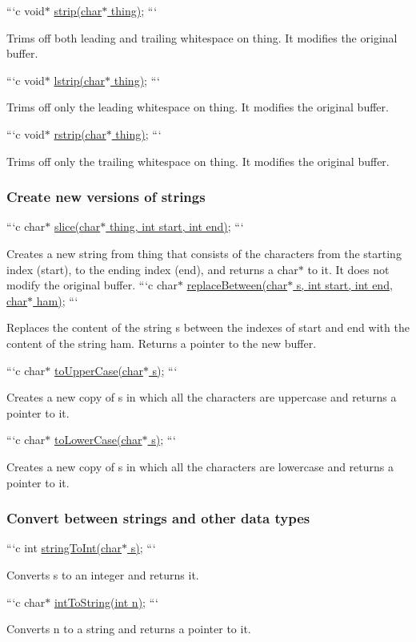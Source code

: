 ```c void$\ast$ \hyperlink{octo_8h_a9cf4ed9ca7179324cdd708784dcaad7a}{strip(char$\ast$ thing)}; ```

Trims off both leading and trailing whitespace on {\ttfamily thing}. It modifies the original buffer.

```c void$\ast$ \hyperlink{octo_8h_acdb2b9d44474319ee92969e31d46e47b}{lstrip(char$\ast$ thing)}; ```

Trims off only the leading whitespace on {\ttfamily thing}. It modifies the original buffer.

```c void$\ast$ \hyperlink{octo_8h_a7a521e251e997480bbfad3343de8558a}{rstrip(char$\ast$ thing)}; ```

Trims off only the trailing whitespace on {\ttfamily thing}. It modifies the original buffer.

\subsubsection*{Create new versions of strings}

```c char$\ast$ \hyperlink{octo_8h_a9f5e0367cd490b8a7694c882eb8a5412}{slice(char$\ast$ thing, int start, int end)}; ```

Creates a new string from {\ttfamily thing} that consists of the characters from the starting index ({\ttfamily start}), to the ending index ({\ttfamily end}), and returns a {\ttfamily char$\ast$} to it. It does not modify the original buffer. ```c char$\ast$ \hyperlink{octo_8h_a375fc67fed1e24e78ce7ba0ac341712d}{replace\-Between(char$\ast$ s, int start, int end, char$\ast$ ham)}; ```

Replaces the content of the string {\ttfamily s} between the indexes of {\ttfamily start} and {\ttfamily end} with the content of the string {\ttfamily ham}. Returns a pointer to the new buffer.

```c char$\ast$ \hyperlink{octo_8h_a82e815f6c65b56b76b7dba6c3b061151}{to\-Upper\-Case(char$\ast$ s)}; ```

Creates a new copy of {\ttfamily s} in which all the characters are uppercase and returns a pointer to it.

```c char$\ast$ \hyperlink{octo_8h_a948d7e7b08ebec3fb5c31ed7626e1303}{to\-Lower\-Case(char$\ast$ s)}; ```

Creates a new copy of {\ttfamily s} in which all the characters are lowercase and returns a pointer to it.

\subsubsection*{Convert between strings and other data types}

```c int \hyperlink{octo_8h_aa656c45e3197bceb9e0835e38be6fed4}{string\-To\-Int(char$\ast$ s)}; ```

Converts {\ttfamily s} to an integer and returns it.

```c char$\ast$ \hyperlink{octo_8h_a739b75490f8ef84d3bc08735536c873c}{int\-To\-String(int n)}; ```

Converts {\ttfamily n} to a string and returns a pointer to it. 
